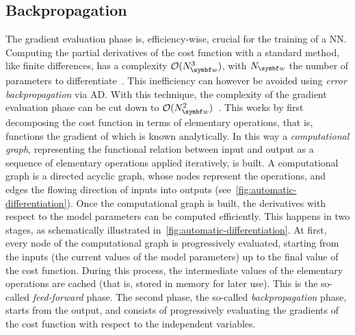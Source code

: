 

\subsection{Backpropagation}
\label{subsec:GL:backpropagation}

The gradient evaluation phase is, efficiency-wise, crucial for the training of a NN.
Computing the partial derivatives of the cost function with a standard method, like finite differences, has a complexity $\mathcal O(N_{\bs w}^3)$, with $N_{\bs w}$ the number of parameters to differentiate~\cite{bishop2006pattern}.
This inefficiency can however be avoided using \emph{error backpropagation} via \ac{AD}.
With this technique, the complexity of the gradient evaluation phase can be cut down to $\mathcal O(N_{\bs w}^2)$~\cite{bishop2006pattern}.
This works by first decomposing the cost function in terms of elementary operations, that is, functions the gradient of which is known analytically.
In this way a \emph{computational graph}, representing the functional relation between input and output as a sequence of elementary operations applied iteratively, is built.
A computational graph is a directed acyclic graph, whose nodes represent the operations, and edges the flowing direction of inputs into outputs (see~\cref{fig:automatic-differentiation}).
Once the computational graph is built, the derivatives with respect to the model parameters can be computed efficiently.
This happens in two stages, as schematically illustrated in~\cref{fig:automatic-differentiation}.
At first, every node of the computational graph is progressively evaluated, starting from the inputs (the current values of the model parameters) up to the final value of the cost function.
During this process, the intermediate values of the elementary operations are cached (that is, stored in memory for later use).
This is the so-called \emph{feed-forward} phase.
The second phase, the so-called \emph{backpropagation} phase, starts from the output, and consists of progressively evaluating the gradients of the cost function with respect to the independent variables.

